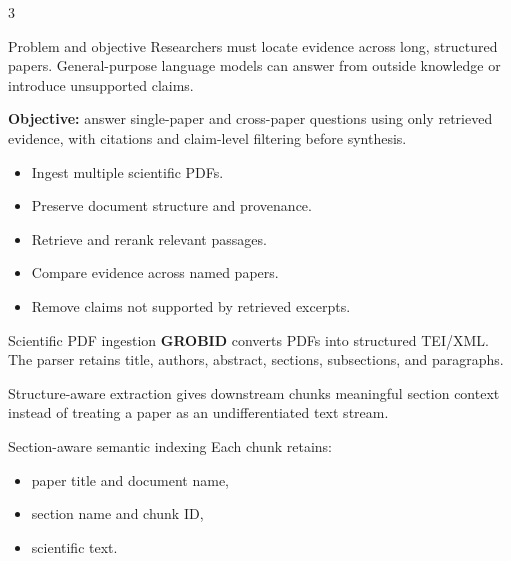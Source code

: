 \documentclass[a0,portrait]{a0poster}
\begin{document}
\begin{multicols}{3}

\begin{posterbox}{Problem and objective}
Researchers must locate evidence across long, structured papers. General-purpose
language models can answer from outside knowledge or introduce unsupported claims.

\textbf{Objective:} answer single-paper and cross-paper questions using only
retrieved evidence, with citations and claim-level filtering before synthesis.

\begin{itemize}
  \item Ingest multiple scientific PDFs.
  \item Preserve document structure and provenance.
  \item Retrieve and rerank relevant passages.
  \item Compare evidence across named papers.
  \item Remove claims not supported by retrieved excerpts.
\end{itemize}
\end{posterbox}

\begin{posterbox}{Scientific PDF ingestion}
\textbf{GROBID} converts PDFs into structured TEI/XML. The parser retains title,
authors, abstract, sections, subsections, and paragraphs.

\begin{center}
\end{center}

Structure-aware extraction gives downstream chunks meaningful section context
instead of treating a paper as an undifferentiated text stream.
\end{posterbox}

\begin{posterbox}{Section-aware semantic indexing}
Each chunk retains:
\begin{itemize}
  \item paper title and document name,
  \item section name and chunk ID,
  \item scientific text.
\end{itemize}


\end{posterbox}
\end{multicols}
\end{document}

